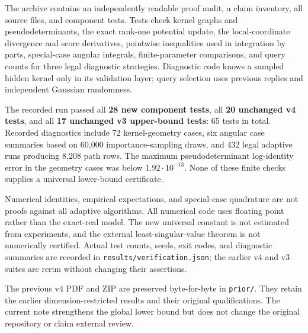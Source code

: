 \documentclass[11pt]{article}
\numberwithin{equation}{section}
\theoremstyle{remark}\newtheorem{remark}[theorem]{Remark}
\begin{document}
The archive contains an independently readable proof audit, a claim inventory, all source files, and component tests. Tests check kernel graphs and pseudodeterminants, the exact rank-one potential update, the local-coordinate divergence and score derivatives, pointwise inequalities used in integration by parts, special-case angular integrals, finite-parameter comparisons, and query counts for three legal diagnostic strategies. Diagnostic code knows a sampled hidden kernel only in its validation layer; query selection uses previous replies and independent Gaussian randomness.

The recorded run passed all \textbf{28 new component tests}, all \textbf{20 unchanged v4 tests}, and all \textbf{17 unchanged v3 upper-bound tests}: 65 tests in total. Recorded diagnostics include 72 kernel-geometry cases, six angular case summaries based on 60,000 importance-sampling draws, and 432 legal adaptive runs producing 8,208 path rows. The maximum pseudodeterminant log-identity error in the geometry cases was below $1.92\cdot10^{-13}$. None of these finite checks supplies a universal lower-bound certificate.

Numerical identities, empirical expectations, and special-case quadrature are not proofs against all adaptive algorithms. All numerical code uses floating point rather than the exact-real model. The new universal constant is not estimated from experiments, and the external least-singular-value theorem is not numerically certified. Actual test counts, seeds, exit codes, and diagnostic summaries are recorded in \texttt{results/verification.json}; the earlier v4 and v3 suites are rerun without changing their assertions.

The previous v4 PDF and ZIP are preserved byte-for-byte in \texttt{prior/}. They retain the earlier dimension-restricted results and their original qualifications. The current note strengthens the global lower bound but does not change the original repository or claim external review.

\appendix
\end{document}
